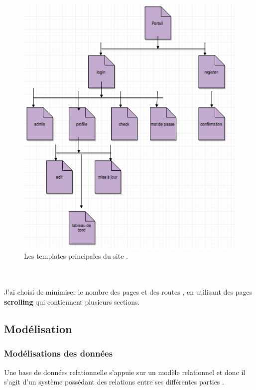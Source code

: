 \documentclass[12pt]{article}
\begin{document}
\begin{center}
\begin{figure}[htp]
  \centering
  \includegraphics[width=12cm]{p3.png}
  \caption{Les templates principales du site  .}
  \label{fig:une-autre-image}
\end{figure}

\end{center}

\\ \\
J'ai choisi de minimiser le nombre des pages et des routes , en utilisant des pages
\textbf{scrolling} qui contiennent plusieurs sections.







\subsection{Modélisation}
\subsubsection{Modélisations des données}


Une base de données relationnelle s'appuie sur un modèle relationnel et donc il s'agit d'un système possédant des relations entre ses différentes parties .\\ \\
\end{document}
